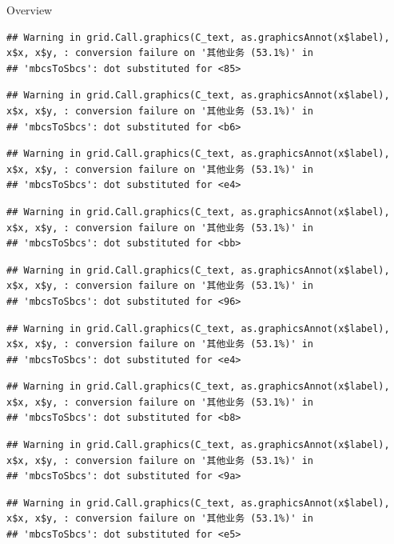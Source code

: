 \documentclass[
  5pt,
  ignorenonframetext,
]{beamer}
\begin{document}
\begin{frame}[fragile]{Overview}
\begin{verbatim}
## Warning in grid.Call.graphics(C_text, as.graphicsAnnot(x$label), x$x, x$y, : conversion failure on '其他业务 (53.1%)' in
## 'mbcsToSbcs': dot substituted for <85>
\end{verbatim}

\begin{verbatim}
## Warning in grid.Call.graphics(C_text, as.graphicsAnnot(x$label), x$x, x$y, : conversion failure on '其他业务 (53.1%)' in
## 'mbcsToSbcs': dot substituted for <b6>
\end{verbatim}

\begin{verbatim}
## Warning in grid.Call.graphics(C_text, as.graphicsAnnot(x$label), x$x, x$y, : conversion failure on '其他业务 (53.1%)' in
## 'mbcsToSbcs': dot substituted for <e4>
\end{verbatim}

\begin{verbatim}
## Warning in grid.Call.graphics(C_text, as.graphicsAnnot(x$label), x$x, x$y, : conversion failure on '其他业务 (53.1%)' in
## 'mbcsToSbcs': dot substituted for <bb>
\end{verbatim}

\begin{verbatim}
## Warning in grid.Call.graphics(C_text, as.graphicsAnnot(x$label), x$x, x$y, : conversion failure on '其他业务 (53.1%)' in
## 'mbcsToSbcs': dot substituted for <96>
\end{verbatim}

\begin{verbatim}
## Warning in grid.Call.graphics(C_text, as.graphicsAnnot(x$label), x$x, x$y, : conversion failure on '其他业务 (53.1%)' in
## 'mbcsToSbcs': dot substituted for <e4>
\end{verbatim}

\begin{verbatim}
## Warning in grid.Call.graphics(C_text, as.graphicsAnnot(x$label), x$x, x$y, : conversion failure on '其他业务 (53.1%)' in
## 'mbcsToSbcs': dot substituted for <b8>
\end{verbatim}

\begin{verbatim}
## Warning in grid.Call.graphics(C_text, as.graphicsAnnot(x$label), x$x, x$y, : conversion failure on '其他业务 (53.1%)' in
## 'mbcsToSbcs': dot substituted for <9a>
\end{verbatim}

\begin{verbatim}
## Warning in grid.Call.graphics(C_text, as.graphicsAnnot(x$label), x$x, x$y, : conversion failure on '其他业务 (53.1%)' in
## 'mbcsToSbcs': dot substituted for <e5>
\end{verbatim}


\end{frame}
\end{document}
